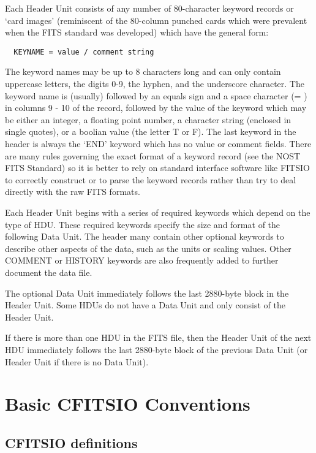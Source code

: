 Each Header Unit consists of any number of 80-character keyword records
or `card images' (reminiscent of the 80-column punched cards which
were prevalent when the FITS standard was developed) which have the
general form:

\begin{verbatim}
  KEYNAME = value / comment string
\end{verbatim}
The keyword names may be up to 8 characters long and can only contain
uppercase letters, the digits 0-9, the hyphen, and the underscore
character. The keyword name is (usually) followed by an equals sign and
a space character (= ) in columns 9 - 10 of the record, followed by the
value of the keyword which may be either an integer, a floating point
number, a character string (enclosed in single quotes), or a boolian
value (the letter T or F). The last keyword in the header is always the
`END' keyword which has no value or comment fields. There are many
rules governing the exact format of a keyword record (see the NOST FITS
Standard) so it is better to rely on standard interface software like
FITSIO to correctly construct or to parse the keyword records rather
than try to deal directly with the raw FITS formats.

Each Header Unit begins with a series of required keywords which depend
on the type of HDU.  These required keywords specify the size and
format of the following Data Unit.  The header many contain other
optional keywords to describe other aspects of the data, such as the
units or scaling values.  Other COMMENT or HISTORY keywords are also
frequently added to further document the data file.

The optional Data Unit immediately follows the last 2880-byte block in
the Header Unit.  Some HDUs do not have a Data Unit and only consist of
the Header Unit.

If there is more than one HDU in the FITS file, then the Header Unit of
the next HDU immediately follows the last 2880-byte block of the
previous Data Unit (or Header Unit if there is no Data Unit).


\chapter{  Basic CFITSIO Conventions }


\section{CFITSIO definitions}


